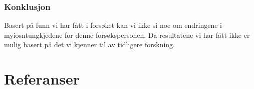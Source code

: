 \documentclass[
  letterpaper,
  DIV=11,
  numbers=noendperiod]{scrreprt}
\begin{document}
\subsection{Konklusjon}\label{konklusjon-1}

Basert på funn vi har fått i forsøket kan vi ikke si noe om endringene i
myiosntungkjedene for denne forsøkspersonen. Da resultatene vi har fått
ikke er mulig basert på det vi kjenner til av tidligere forskning.


\chapter*{Referanser}\label{referanser}

\label{refs}
\end{document}
